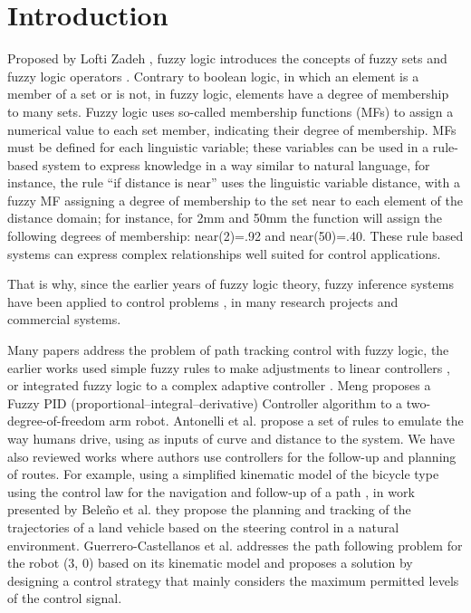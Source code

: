 \documentclass[symmetry,article,submit,moreauthors,pdftex]{Definitions/mdpi}
\begin{document}
\section{Introduction}

Proposed by Lofti Zadeh \cite{goguen_zadeh_1973}, fuzzy logic introduces the
concepts of fuzzy sets and fuzzy logic operators \cite{zadeh1996fuzzy}.
Contrary to boolean logic, in which an element is a member of a set or is not,
in fuzzy logic, elements have a degree of membership to many sets. Fuzzy logic uses
so-called membership functions (MFs) to assign a numerical value to each set
member, indicating their degree of membership. MFs must be defined for each
linguistic variable; these variables can be used in a rule-based system to
express knowledge in a way similar to natural language, for instance, the rule
``if distance is near'' uses the linguistic variable distance, with a fuzzy MF
assigning a degree of membership to the set near to each element of the
distance domain; for instance, for 2mm and 50mm the function will assign the
following degrees of membership: near(2)=.92 and near(50)=.40. These rule based
systems can express complex relationships well suited for control applications.

That is why, since the earlier years of fuzzy logic theory, fuzzy inference
systems \cite{driankov_introduction_2013} have been applied to control problems
\cite{mamdani1974application,king1977application,passino1998fuzzy,driankov_introduction_2013},
in many research projects \cite{yang_improved_2003,driankov_fuzzy_2013} and
commercial systems.

Many papers address the problem of path tracking control with fuzzy logic, the
earlier works used simple fuzzy rules to make adjustments to linear controllers
\cite{lee_practical_2003}, or integrated fuzzy logic to a complex adaptive
controller \cite{sanchez1997adaptive}. Meng \cite{bi_control_2020} proposes a
Fuzzy PID (proportional–integral–derivative) Controller algorithm to a
two-degree-of-freedom arm robot. Antonelli et al.
\cite{antonelli_fuzzy-logic-based_2007} propose a set of rules to emulate the
way humans drive, using as inputs of curve and distance to the system.  We have
also reviewed works where authors use controllers for the follow-up and planning
of routes. For example, using a simplified kinematic model of the bicycle type
using the control law for the navigation and follow-up of a path
\cite{laumond_robot_1998}, in work presented by Beleño et al.
\cite{beleno_planeacion_2014} they propose the planning and tracking of the
trajectories of a land vehicle based on the steering control in a natural
environment.  Guerrero-Castellanos et al.
\cite{guerrero-castellanos_trajectory_2014} addresses the path following problem
for the robot (3, 0) based on its kinematic model and proposes a solution by
designing a control strategy that mainly considers the maximum permitted levels
of the control signal.
\end{document}
